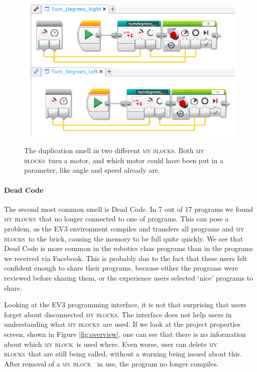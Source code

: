 \documentclass{sig-alternate}
\newcommand{\mbs}{\textsc{my blocks}}
\newcommand{\mb}{\textsc{my block}}
\begin{document}
\begin{figure} [ht]
\caption{The duplication smell in two different \mbs. Both \mbs~turn a motor, and which motor could have been put in a parameter, like angle and speed already are. }
\centering
\includegraphics[width=\columnwidth]{img/dup_ev3_myblocks}
\label{fig:dup_ev3_myblocks}
\end{figure}

\paragraph{Dead Code}
The second most common smell is Dead Code. In 7 out of 17 programs we found \mbs~that no longer connected to one of programs. This can pose a problem, as the EV3 environment compiles and transfers all programs and \mbs~to the brick, causing the memory to be full quite quickly. We see that Dead Code is more common in the robotics class programs than in the programs we received via Facebook. This is probably due to the fact that these users felt confident enough to share their programs, because either the programs were reviewed before sharing them, or the experience users selected `nice' programs to share.

Looking at the EV3 programming interface, it is not that surprising that users forget about disconnected \mbs. The interface does not help users in understanding what \mbs~are used. If we look at the project properties screen, shown in Figure \ref{fig:overview}, one can see that there is no information about which \mb~is used where. Even worse, user can delete \mbs~that are still being called, without a warning being issued about this. After removal of a \mb~ in use, the program no longer compiles.
\end{document}

